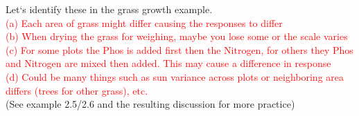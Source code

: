 \documentclass{report}
\begin{document}
Let`s identify these in the grass growth example.
\textcolor{red}{\\
(a) Each area of grass might differ causing the responses to differ\\
(b) When drying the grass for weighing, maybe you lose some or the scale varies\\
(c) For some plots the Phos is added first then the Nitrogen, for others they Phos and Nitrogen are mixed then added.  This  may cause a difference in response\\
(d) Could be many things such as sun variance across plots or neighboring area differs (trees for other grass), etc.\\}
(See example 2.5/2.6 and the resulting discussion for more practice)

\newpage
\end{document}
